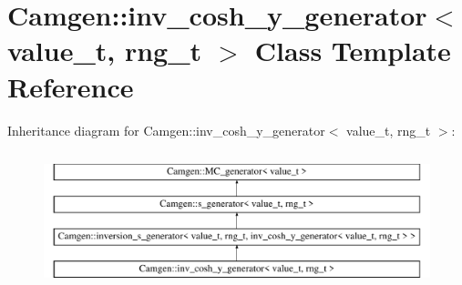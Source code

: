 \hypertarget{a00316}{\section{Camgen\-:\-:inv\-\_\-cosh\-\_\-y\-\_\-generator$<$ value\-\_\-t, rng\-\_\-t $>$ Class Template Reference}
\label{a00316}
}
Inheritance diagram for Camgen\-:\-:inv\-\_\-cosh\-\_\-y\-\_\-generator$<$ value\-\_\-t, rng\-\_\-t $>$\-:\begin{figure}[H]
\begin{center}
\leavevmode
\includegraphics[height=4.000000cm]{a00316}
\end{center}
\end{figure}
